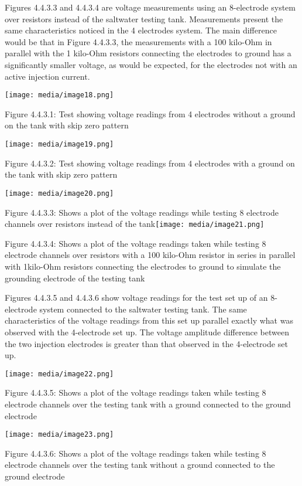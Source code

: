 Figures 4.4.3.3 and 4.4.3.4 are voltage measurements using an
8-electrode system over resistors instead of the saltwater testing tank.
Measurements present the same characteristics noticed in the 4
electrodes system. The main difference would be that in Figure 4.4.3.3,
the measurements with a 100 kilo-Ohm in parallel with the 1 kilo-Ohm
resistors connecting the electrodes to ground has a significantly
smaller voltage, as would be expected, for the electrodes not with an
active injection current.

\texttt{[image: media/image18.png]}

Figure 4.4.3.1: Test showing voltage readings from 4 electrodes without
a ground on the tank with skip zero pattern

\texttt{[image: media/image19.png]}

Figure 4.4.3.2: Test showing voltage readings from 4 electrodes with a
ground on the tank with skip zero pattern

\texttt{[image: media/image20.png]}

Figure 4.4.3.3: Shows a plot of the voltage readings while testing 8
electrode channels over resistors instead of the
tank\texttt{[image: media/image21.png]}

Figure 4.4.3.4: Shows a plot of the voltage readings taken while testing
8 electrode channels over resistors with a 100 kilo-Ohm resistor in
series in parallel with 1kilo-Ohm resistors connecting the electrodes to
ground to simulate the grounding electrode of the testing tank

Figures 4.4.3.5 and 4.4.3.6 show voltage readings for the test set up of
an 8-electrode system connected to the saltwater testing tank. The same
characteristics of the voltage readings from this set up parallel
exactly what was observed with the 4-electrode set up. The voltage
amplitude difference between the two injection electrodes is greater
than that observed in the 4-electrode set up.

\texttt{[image: media/image22.png]}

Figure 4.4.3.5: Shows a plot of the voltage readings taken while testing
8 electrode channels over the testing tank with a ground connected to
the ground electrode

\texttt{[image: media/image23.png]}

Figure 4.4.3.6: Shows a plot of the voltage readings taken while testing
8 electrode channels over the testing tank without a ground connected to
the ground electrode

